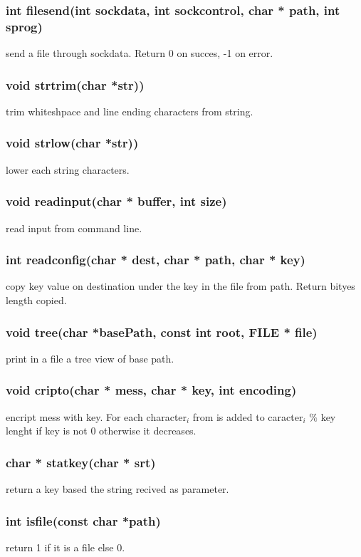 \documentclass[runningheads]{llncs}
\begin{document}
        \subsubsection{int file\textunderscore send(int sock\textunderscore data, int sock\textunderscore control, char * path, int s\textunderscore prog)}
            send a file through sock\textunderscore data. Return 0 on succes, -1 on error.
        \subsubsection{void strtrim(char *str))}
            trim whiteshpace and line ending characters from string.
        \subsubsection{void strlow(char *str))}
            lower each string characters.
        \subsubsection{void read\textunderscore input(char * buffer, int size)}
            read input from command line.
        \subsubsection{int readconfig(char * dest, char * path, char * key)}
            copy key value on destination under the key in the file from path. Return bityes length copied.
        \subsubsection{void tree(char *basePath, const int root, FILE * file)}
            print in a file a tree view of base path.
        \subsubsection{void cripto(char * mess, char * key, int encoding)}
            encript mess with key. For each character$_i$ from is added to caracter$_i$ $\%$ key lenght if key is not 0 otherwise it decreases.
        \subsubsection{char * statkey(char * srt)}
            return a key based the string recived as parameter.
        \subsubsection{int is\textunderscore file(const char *path)}
            return 1 if it is a file else 0.
\end{document}
